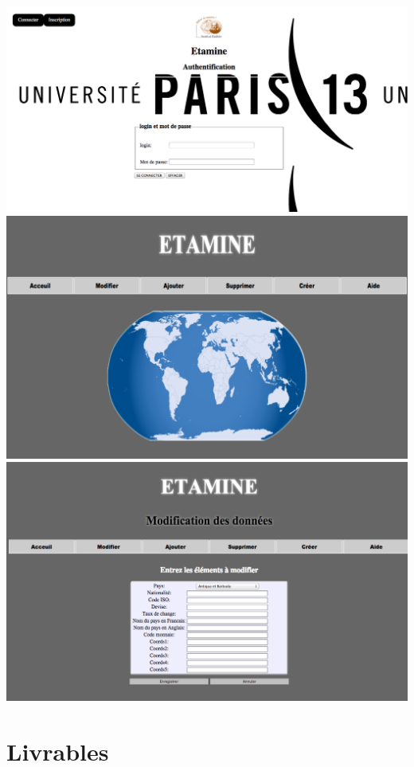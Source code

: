 \documentclass[12pt,a4paper,article]{memoir} %
\begin{document}
\includegraphics[scale = 0.4]{images/Image5}
\break \break
\includegraphics[scale = 0.4]{images/Image6}
\includegraphics[scale = 0.4]{images/Image7}

\chapter{Livrables}
\end{document}
